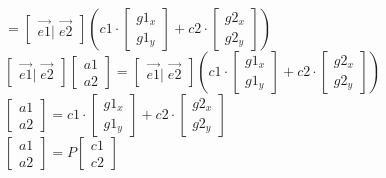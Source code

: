 \documentclass[12pt]{article}
\begin{document}
\begin{flushleft}
    $ = \begin{bmatrix}
            \vec{e1} | \; \vec{e2}
        \end{bmatrix}(c1 \cdot \begin{bmatrix}
            g1_{x} \\
            g1_{y}
        \end{bmatrix} + c2 \cdot \begin{bmatrix}
            g2_{x} \\
            g2_{y}
        \end{bmatrix}) $ \\


    $\begin{bmatrix}
            \vec{e1} | \; \vec{e2}
        \end{bmatrix}\begin{bmatrix}
            a1 \\
            a2
        \end{bmatrix} = \begin{bmatrix}
            \vec{e1} | \; \vec{e2}
        \end{bmatrix} (c1 \cdot \begin{bmatrix}
            g1_{x} \\
            g1_{y}
        \end{bmatrix} + c2 \cdot \begin{bmatrix}
            g2_{x} \\
            g2_{y}
        \end{bmatrix})$ \\


    $\begin{bmatrix}
            a1 \\
            a2
        \end{bmatrix} = c1 \cdot \begin{bmatrix}
            g1_{x} \\
            g1_{y}
        \end{bmatrix} + c2 \cdot \begin{bmatrix}
            g2_{x} \\
            g2_{y}
        \end{bmatrix} $ \\
    $\begin{bmatrix}
            a1 \\
            a2
        \end{bmatrix} = P \begin{bmatrix}
            c1 \\
            c2
        \end{bmatrix}$


\end{flushleft}
\end{document}
